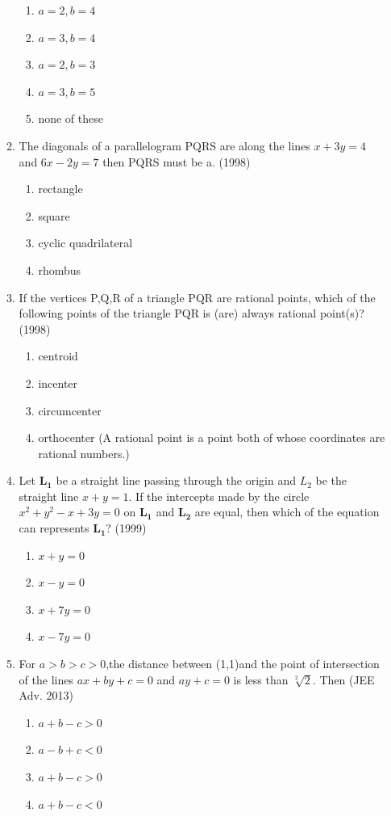 \documentclass[12pt]{article}
\let\vec\mathbf
\begin{document}
\begin{enumerate}
\begin{enumerate}
\begin{enumerate}
\item $a=2,b=4$
\item $a=3,b=4$ 
\item $a=2,b=3$
\item $a=3,b=5$
\item none of these
\end{enumerate}
\item The diagonals of a parallelogram PQRS are along the lines $x+3y=4$ and $6x-2y=7$ then PQRS must be a. (1998)
\begin{enumerate}
\item rectangle
\item square
\item cyclic quadrilateral
\item rhombus
\end{enumerate}
\item If the vertices P,Q,R of a triangle PQR are rational points, which of the following points of the triangle PQR is (are) always rational point(s)? (1998)
\begin{enumerate}
\item centroid 
\item incenter
\item circumcenter 
\item orthocenter
(A rational point is a point both of whose coordinates are rational numbers.)
\end{enumerate}
\item  Let $\vec{L_1}$ be a straight line passing through the origin and $L_2$ be the straight line $x+y=1$. If the intercepts made by the circle $x^2+y^2-x+3y=0$ on $\vec{L_1}$ and $\vec{L_2}$ are equal, then which of the equation can represents $\vec{L_1}$? (1999)
\begin{enumerate}
\item $x+y=0$   
\item $x-y=0$ 
\item $x+7y=0$  
\item $x-7y=0$
\end{enumerate}
\item For $a>b>c>0$,the distance between (1,1)and the point of intersection of the lines $ax+by+c=0$ and $ay+c=0$ is less than $\sqrt[2]{2}$. Then (JEE Adv. 2013)
\begin{enumerate}
\item $a+b-c>0$ 
\item $a-b+c<0$
\item $a+b-c>0$
\item $a+b-c<0$
\end{enumerate}


\end{enumerate}
\end{enumerate}
\end{document}
